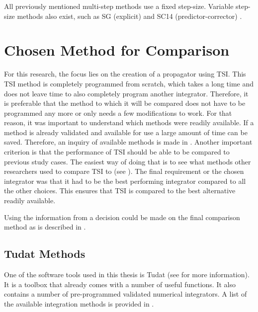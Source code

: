 All previously mentioned multi-step methods use a fixed step-size. Variable step-size methods also exist, such as \ac{SG} (explicit) \citep{meijaard1991,berry2004} and \ac{SC14} (predictor-corrector) \citep{berry2004,ramos2005}.


\section{Chosen Method for Comparison}
\label{sec:chosenMethodForComparison}
For this research, the focus lies on the creation of a propagator using \ac{TSI}. This \ac{TSI} method is completely programmed from scratch, which takes a long time and does not leave time to also completely program another integrator. Therefore, it is preferable that the method to which it will be compared does not have to be programmed any more or only needs a few modifications to work. For that reason, it was important to understand which methods were readily available. If a method is already validated and available for use a large amount of time can be saved. Therefore, an inquiry of available methods is made in . Another important criterion is that the performance of \ac{TSI} should be able to be compared to previous study cases. The easiest way of doing that is to see what methods other researchers used to compare \ac{TSI} to (see ). 
The final requirement or the chosen integrator was that it had to be the best performing integrator compared to all the other choices. This ensures that \ac{TSI} is compared to the best alternative readily available.

Using the information from  a decision could be made on the final comparison method as is described in .

\subsection{\acl{Tudat} Methods}
\label{subsec:tudatMethods}
One of the software tools used in this thesis is \acf{Tudat} (see  for more information). It is a toolbox that already comes with a number of useful functions. It also contains a number of pre-programmed validated numerical integrators. A list of the available integration methods is provided in .



